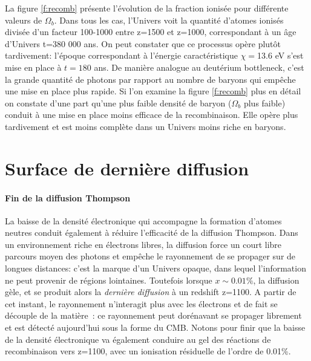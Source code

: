 La figure \ref{f:recomb} présente l'évolution de la fraction ionisée pour différente valeurs de $\Omega_b$. Dans tous les cas, l'Univers voit la quantité d'atomes ionisés divisée d'un facteur 100-1000 entre z=1500 et z=1000, correspondant à un âge d'Univers t=380 000 ans. On peut constater que ce processus opère plutôt tardivement: l'époque correspondant à l'énergie caractéristique $\chi=$13.6 eV s'est mise en place à $t=180$ ans. De manière analogue au deutérium bottleneck, c'est la grande quantité de photons par rapport au nombre de baryons  qui empêche une mise en place plus rapide. Si l'on examine la figure \ref{f:recomb} plus en détail on constate d'une part qu'une plus faible densité de baryon ($\Omega_b$ plus faible) conduit à une mise en place moins efficace de la recombinaison. Elle opère plus tardivement et est moins complète dans un Univers moins riche en baryons.

\section{Surface de dernière diffusion}

\paragraph{Fin de la diffusion Thompson} La baisse de la densité électronique qui accompagne la formation d'atomes neutres conduit également à réduire l'efficacité de la diffusion Thompson. Dans un environnement riche en électrons libres, la diffusion force un court libre parcours moyen des photons et empêche le rayonnement de se propager sur de longues distances: c'est la marque d'un Univers opaque, dans lequel l'information ne peut provenir de régions lointaines.  Toutefois lorsque $x\sim 0.01\%$, la diffusion gèle, et se produit alors la \textit{dernière diffusion} à un redshift z=1100. A partir de cet instant, le rayonnement n'interagit plus avec les électrons et de fait se découple de la matière~: ce rayonnement peut dorénavant se propager librement et est détecté aujourd'hui sous la forme du CMB. Notons pour finir que la baisse de la densité électronique va également conduire au gel des réactions de recombinaison vers z=1100, avec un ionisation résiduelle de l'ordre de 0.01\%.



